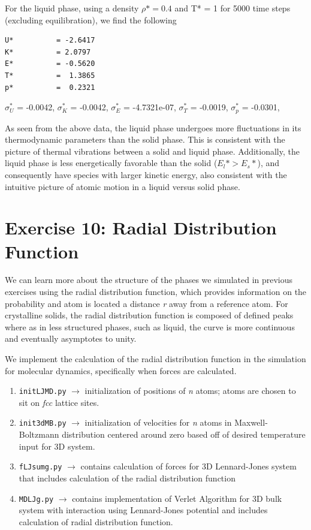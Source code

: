\documentclass[12pt, oneside]{article}
\begin{document}
For the liquid phase, using a density $\rho* = 0.4$ and T* = 1 for 5000 time steps (excluding equilibration), we find the following

\begin{verbatim}
U* 			= -2.6417
K*			= 2.0797
E* 			= -0.5620
T*			=  1.3865
p* 			=  0.2321
\end{verbatim}

$\sigma_{U}^*$ 	=  -0.0042,
$\sigma_{K}^*$ 	=  -0.0042,
$\sigma_{E}^*$	= -4.7321e-07,
$\sigma_{T}^*$	= -0.0019,
$\sigma_{p}^*$ 	= -0.0301,


As seen from the above data, the liquid phase undergoes more fluctuations in its thermodynamic parameters than the solid phase. This is consistent with the picture of thermal vibrations between a solid and liquid phase. Additionally, the liquid phase is less energetically favorable than the solid ($E_{l}* > E_{s}*$), and consequently have species with larger kinetic energy, also consistent with the intuitive picture of atomic motion in a liquid versus solid phase.

\section{Exercise 10: Radial Distribution Function}

We can learn more about the structure of the phases we simulated in previous exercises using the radial distribution function, which provides information on the probability and atom is located a distance \textit{r} away from a reference atom. For crystalline solids, the radial distribution function is composed of defined peaks where as in less structured phases, such as liquid, the curve is more continuous and eventually asymptotes to unity.

We implement the calculation of the radial distribution function in the simulation for molecular dynamics, specifically when forces are calculated.

\vspace{5mm}
 \begin{enumerate}
   \item \verb!initLJMD.py!   $\rightarrow$ initialization of positions of \textit{n} atoms; atoms are chosen to sit on \textit{fcc} lattice sites.  
   \item \verb!init3dMB.py!   $\rightarrow$ initialization of velocities for \textit{n} atoms in Maxwell-Boltzmann distribution centered around zero based off of desired temperature input for 3D system.
     \item \verb!fLJsumg.py!     $\rightarrow$ contains calculation of forces for 3D Lennard-Jones system that includes calculation of the radial distribution function
    \item \verb!MDLJg.py!  $\rightarrow$ contains implementation of Verlet Algorithm for 3D bulk system with interaction using Lennard-Jones potential and includes calculation of radial distribution function.
\end{enumerate}
\vspace{5mm}
 
\end{document}
